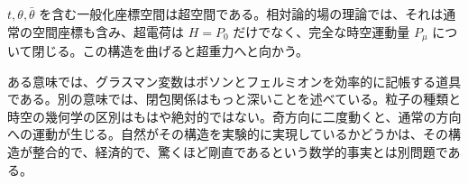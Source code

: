 \(t,\theta,\bar\theta\) を含む一般化座標空間は超空間である。相対論的場の理論では、それは通常の空間座標も含み、超電荷は \(H=P_0\) だけでなく、完全な時空運動量 \(P_\mu\) について閉じる。この構造を曲げると超重力へと向かう。

ある意味では、グラスマン変数はボソンとフェルミオンを効率的に記帳する道具である。別の意味では、閉包関係はもっと深いことを述べている。粒子の種類と時空の幾何学の区別はもはや絶対的ではない。奇方向に二度動くと、通常の方向への運動が生じる。自然がその構造を実験的に実現しているかどうかは、その構造が整合的で、経済的で、驚くほど剛直であるという数学的事実とは別問題である。
